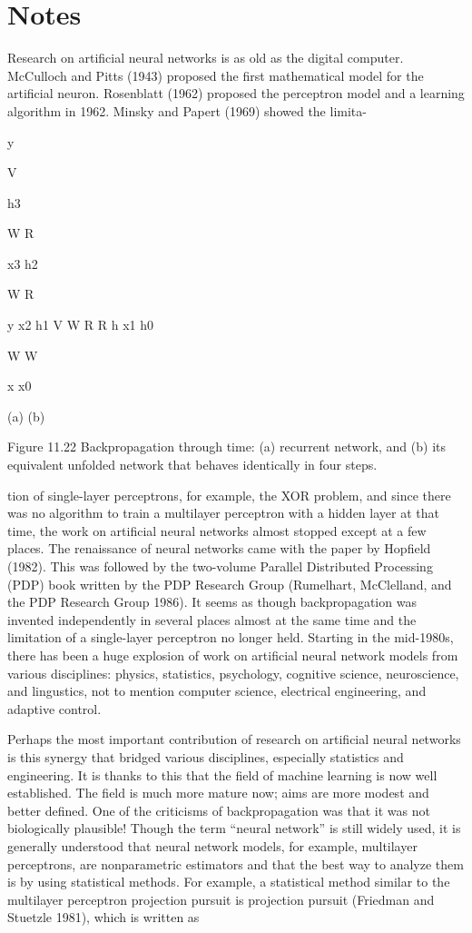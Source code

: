 \section{Notes}

Research on artificial neural networks is as old as the digital computer. McCulloch and Pitts (1943) proposed the first mathematical model for the artificial neuron. Rosenblatt (1962) proposed the perceptron model and a learning algorithm in 1962. Minsky and Papert (1969) showed the limita-

y

V

h3

W R

x3 h2

W R

y x2 h1 V W R R h x1 h0

W W

x x0

(a) (b)

Figure 11.22 Backpropagation through time: (a) recurrent network, and (b) its equivalent unfolded network that behaves identically in four steps.

tion of single-layer perceptrons, for example, the XOR problem, and since there was no algorithm to train a multilayer perceptron with a hidden layer at that time, the work on artificial neural networks almost stopped except at a few places. The renaissance of neural networks came with the paper by Hopfield (1982). This was followed by the two-volume Parallel Distributed Processing (PDP) book written by the PDP Research Group (Rumelhart, McClelland, and the PDP Research Group 1986). It seems as though backpropagation was invented independently in several places almost at the same time and the limitation of a single-layer perceptron no longer held. Starting in the mid-1980s, there has been a huge explosion of work on artificial neural network models from various disciplines: physics, statistics, psychology, cognitive science, neuroscience, and lingustics, not to mention computer science, electrical engineering, and adaptive control.

Perhaps the most important contribution of research on artificial neural networks is this synergy that bridged various disciplines, especially statistics and engineering. It is thanks to this that the field of machine learning is now well established. The field is much more mature now; aims are more modest and better defined. One of the criticisms of backpropagation was that it was not biologically plausible! Though the term “neural network” is still widely used, it is generally understood that neural network models, for example, multilayer perceptrons, are nonparametric estimators and that the best way to analyze them is by using statistical methods. For example, a statistical method similar to the multilayer perceptron projection pursuit is projection pursuit (Friedman and Stuetzle 1981), which is written as

